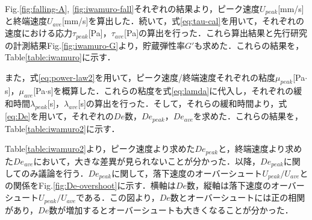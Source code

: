 Fig.\ref{fig:falling-A}, \ref{fig:iwamuro-fall}それぞれの結果より，ピーク速度$U_{peak}$[mm/s]と終端速度$U_{ave}$[mm/s]を算出した．続いて，式\ref{eq:tau-cal}を用いて，それぞれの速度における応力$\tau_{peak}$[Pa]，$\tau_{ave}$[Pa]の算出を行った．これら算出結果と先行研究の計測結果Fig.\ref{fig:iwamuro-G}より，貯蔵弾性率$G'$も求めた．これらの結果を，Table\ref{table:iwamuro}に示す．

また，式\ref{eq:power-law2}を用いて，ピーク速度/終端速度それぞれの粘度$\mu_{peak}$[Pa$\cdot$s]，$\mu_{ave}$[Pa$\cdot$s]を概算した．これらの粘度を式\ref{eq:lamda}に代入し，それぞれの緩和時間$\lambda_{peak}$[s]，$\lambda_{ave}$[s]の算出を行った．そして，それらの緩和時間より，式\ref{eq:De}を用いて，それぞれの$De$数，$De_{peak}$，$De_{ave}$を求めた．これらの結果を，Table\ref{table:iwamuro2}に示す．

Table\ref{table:iwamuro2}より，ピーク速度より求めた$De_{peak}$と，終端速度より求めた$De_{ave}$において，大きな差異が見られないことが分かった．以降，$De_{peak}$に関してのみ議論を行う．$De_{peak}$に関して，落下速度のオーバーシュート$U_{peak}/U_{ave}$との関係をFig.\ref{fig:De-overshoot}に示す．横軸は$De$数，縦軸は落下速度のオーバーシュート$U_{peak}/U_{ave}$である．この図より，$De$数とオーバーシュートには正の相関があり，$De$数が増加するとオーバーシュートも大きくなることが分かった．

